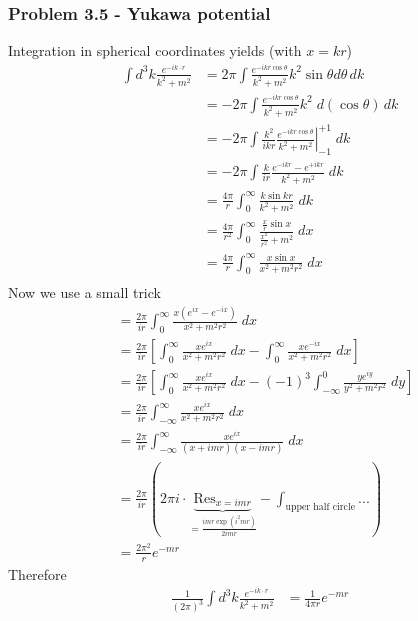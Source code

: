 \documentclass[10pt,a4paper]{article}
\theoremstyle{definition}
\begin{document}
\subsubsection{Problem 3.5 - Yukawa potential}
Integration in spherical coordinates yields (with $x=kr$)
\begin{align}
    \int d^3k\frac{e^{-ik\cdot r}}{k^2+m^2}
    &=2\pi\int  \frac{e^{-ikr\cos{\theta}}}{k^2+m^2} k^2\sin\theta d\theta\, dk\\
    &=-2\pi\int \frac{e^{-ikr\cos{\theta}}}{k^2+m^2} k^2 \; d(\cos\theta)\, dk\\
    &=-2\pi\int \left.\frac{k^2}{ikr}\frac{e^{-ikr\cos{\theta}}}{k^2+m^2} \right|_{-1}^{+1} \; dk\\
    &=-2\pi\int \frac{k}{ir}\frac{e^{-ikr}-e^{+ikr}}{k^2+m^2}  \; dk\\
    &=\frac{4\pi}{r}\int_0^\infty  \frac{k\sin{kr}}{k^2+m^2}  \; dk\\
    &=\frac{4\pi}{r^2}\int_0^\infty  \frac{\frac{x}{r}\sin{x}}{\frac{x^2}{r^2}+m^2}  \; dx\\
    &=\frac{4\pi}{r}\int_0^\infty  \frac{x\sin{x}}{x^2+m^2r^2}  \; dx\\
\end{align}
Now we use a small trick
\begin{align}
    &=\frac{2\pi}{ir}\int_0^\infty  \frac{x(e^{ix}-e^{-ix})}{x^2+m^2r^2}  \; dx\\
    &=\frac{2\pi}{ir}\left[\int_0^\infty\frac{xe^{ix}}{x^2+m^2r^2}  \; dx - \int_0^\infty\frac{xe^{-ix}}{x^2+m^2r^2}  \; dx\right]\\
    &=\frac{2\pi}{ir}\left[\int_0^\infty\frac{xe^{ix}}{x^2+m^2r^2}  \; dx - (-1)^3 \int_{-\infty}^0\frac{ye^{iy}}{y^2+m^2r^2}  \; dy\right]\\
    &=\frac{2\pi}{ir}\int_{-\infty}^\infty\frac{xe^{ix}}{x^2+m^2r^2}  \; dx \\
    &=\frac{2\pi}{ir}\int_{-\infty}^\infty\frac{xe^{ix}}{(x+imr)(x-imr)}  \; dx \\
    &= \frac{2\pi}{ir}\left(2\pi i\cdot \underbrace{\text{Res}_{x=imr}}_{=\frac{imr\exp(i^2mr)}{2imr}}-\int_\text{upper half circle}...\right)\\
    &= \frac{2\pi^2}{r} e^{-mr}
\end{align}
Therefore
\begin{align}
    \frac{1}{(2\pi)^3}\int d^3k\frac{e^{-ik\cdot r}}{k^2+m^2}
    &= \frac{1}{4\pi r} e^{-mr}
\end{align}
\end{document}
